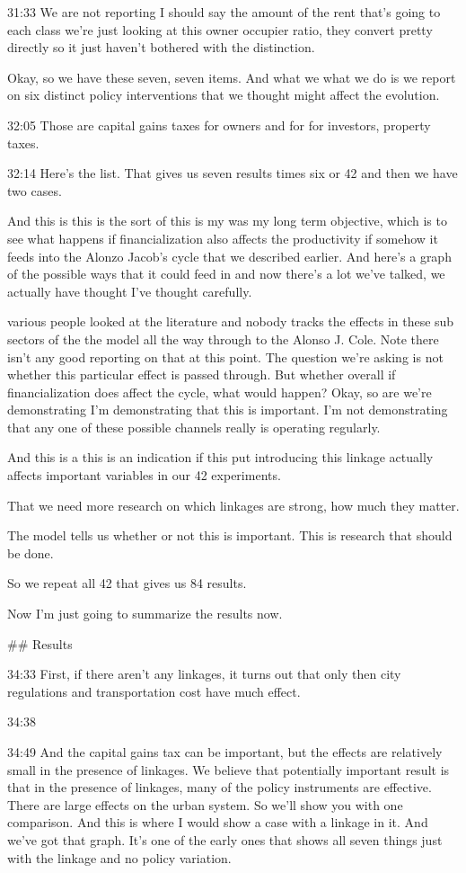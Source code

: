 31:33
We are not reporting I should say the amount of the rent that's going to each class we're just looking at this owner occupier ratio, they convert pretty directly so it just haven't bothered with the distinction.

Okay, so we have these seven, seven items. And what we what we do is we report on six distinct policy interventions that we thought might affect the evolution.

32:05
Those are capital gains taxes for owners and for for investors, property taxes.

32:14
Here's the list.
That gives us seven results times six or 42 and then we have two cases. 

And this is this is the sort of this is my was my long term objective, which is to see what happens if financialization also affects the productivity if somehow it feeds into the Alonzo Jacob's cycle that we described earlier. And here's a graph of the possible ways that it could feed in and now there's a lot we've talked, we actually have thought I've thought carefully. 

various people looked at the literature and nobody tracks the effects in these sub sectors of the the model all the way through to the Alonso J. Cole. Note there isn't any good reporting on that at this point. The question we're asking is not whether this particular effect is passed through. But whether overall if financialization does affect the cycle, what would happen? Okay, so are we're demonstrating I'm demonstrating that this is important. I'm not demonstrating that any one of these possible channels really is operating regularly.

And this is a this is an indication if this put introducing this linkage actually affects important variables in our 42 experiments.

That we need more research on which linkages are strong, how much they matter.

The model tells us whether or not this is important. This is research that should be done.

So we repeat all 42 that gives us 84 results.

Now I'm just going to summarize the results now.

## Results

34:33
First, if there aren't any linkages, it turns out that only then city regulations and transportation cost have much effect.

34:38


34:49
And the capital gains tax can be important, but the effects are relatively small in the presence of linkages. We believe that potentially important result is that in the presence of linkages, many of the policy instruments are effective.
There are large effects on the urban system. So we'll show you with one comparison. And this is where I would show a case with a linkage in it. And we've got that graph. It's one of the early ones that shows all seven things just with the linkage and no policy variation. 

